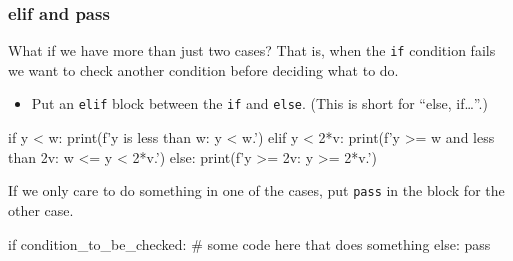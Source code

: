 \documentclass{beamer}
\newenvironment{codeblock}
    {\hfill\begin{beamerboxesrounded}[lower=codecol, width=0.8\textwidth]
    \medskip

    }
    { 
    \end{beamerboxesrounded}\hfill
    }
\theoremstyle{example}
\newcommand{\ttt}[1]{{\small\texttt{#1}}}
\begin{document}
\begin{frame}[fragile]
\frametitle{{\ttm elif} and {\ttm pass}}

What if we have more than just two cases? That is, when the \ttt{if} condition fails we want to check another condition before deciding what to do.

\pause
\begin{itemize}
	\item[] Put an \ttt{elif} block between the \ttt{if} and \ttt{else}. (This is short for ``else, if\ldots''.)
\end{itemize}

\begin{codeblock}

\begin{python}
if y < w:
    print(f'y is less than w: {y} < {w}.')
elif y < 2*v:
    print(f'y >= w and less than 2v: {w} <= {y} < {2*v}.')
else:
    print(f'y >= 2v: {y} >= {2*v}.')
\end{python}

\end{codeblock}

\vfill
\pause
If we only care to do something in one of the cases, put \ttt{pass} in the block for the other case.

\begin{codeblock}

\begin{python}
if condition_to_be_checked:
    # some code here that does something
else:
    pass
\end{python}

\end{codeblock}
\end{frame}
\end{document}
